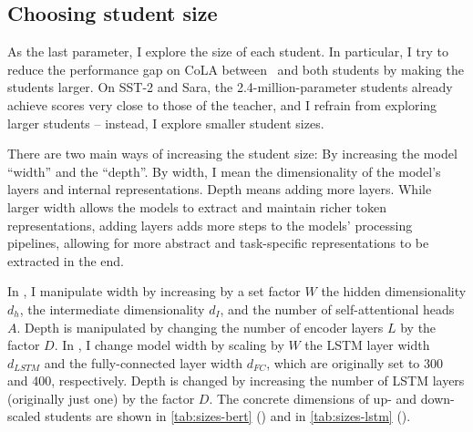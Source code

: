 {  \subsection{Choosing student size}{
    \label{sec:A-student-size}
    As the last parameter, I explore the size of each student. In particular, I try to reduce the performance gap on CoLA between \BERTT~and both students by making the students larger. On SST-2 and Sara, the 2.4-million-parameter students already achieve scores very close to those of the teacher, and I refrain from exploring larger students -- instead, I explore smaller student sizes.

    There are two main ways of increasing the student size: By increasing the model ``width'' and the ``depth''. By width, I mean the dimensionality of the model's layers and internal representations. Depth means adding more layers. While larger width allows the models to extract and maintain richer token representations, adding layers adds more steps to the models' processing pipelines, allowing for more abstract and task-specific representations to be extracted in the end.

    In \BERTS, I manipulate width by increasing by a set factor $W$ the hidden dimensionality $d_h$, the intermediate dimensionality $d_I$, and the number of self-attentional heads $A$. Depth is manipulated by changing the number of encoder layers $L$ by the factor $D$.
    In \LSTMS, I change model width by scaling by $W$ the LSTM layer width $d_{LSTM}$ and the fully-connected layer width $d_{FC}$, which are originally set to 300 and 400, respectively. Depth is changed by increasing the number of LSTM layers (originally just one) by the factor $D$.
    The concrete dimensions of up- and down-scaled students are shown in \autoref{tab:sizes-bert} (\BERTS) and in \autoref{tab:sizes-lstm} (\LSTMS).

}}
